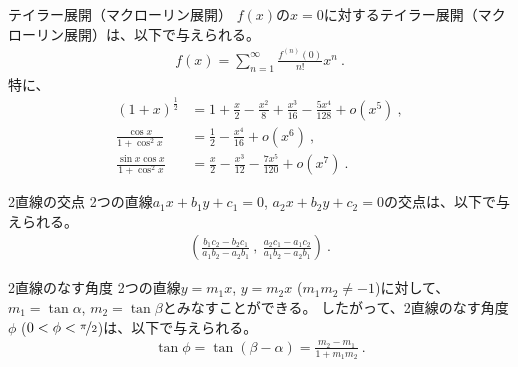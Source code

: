 




\begin{Formula}[label=formula:taylorexpansion]{テイラー展開（マクローリン展開）}
$f(x)$の$x = 0$に対するテイラー展開（マクローリン展開）は、以下で与えられる。
\begin{align*}
  f(x) = \sum_{n=1}^{\infty}\frac{f^{(n)}(0)}{n!}x^n\ .
\end{align*}
\tcbline*
特に、
\begin{align*}
  (1+x)^\frac12 &= 1+\frac x2-\frac{x^2}8+\frac{x^3}{16}-\frac{5x^4}{128}+o\!\left(x^5\right)\ ,\\
  \frac{\cos x}{1+\cos^2x} &= \frac12-\frac{x^4}{16}+o\left(x^6\right)\ ,\\
  \frac{\sin x\cos x}{1+\cos^2x} &= \frac x2-\frac{x^3}{12}-\frac{7x^5}{120}+o\left(x^7\right)\ .
\end{align*}
\end{Formula}



\begin{Formula}[label=formula:intersectionof2lines]{2直線の交点}
2つの直線$a_1x+b_1y+c_1 = 0$, $a_2x+b_2y+c_2 = 0$の交点は、以下で与えられる。
\begin{align*}
  \left(
  \frac{b_1c_2-b_2c_1}{a_1b_2-a_2b_1}~,~
  \frac{a_2c_1-a_1c_2}{a_1b_2-a_2b_1}
  \right)\ .
\end{align*}
\end{Formula}

\begin{Formula}[label=formula:anblebetween2lines]{2直線のなす角度}
2つの直線$y = m_1x$, $y = m_2x$ ($m_1m_2 \ne -1$)に対して、$m_1 = \tan\alpha$, $m_2 = \tan\beta$とみなすことができる。
したがって、2直線のなす角度$\phi$ ($0 < \phi < \nicefrac\pi2$)は、以下で与えられる。
\begin{align*}
  \tan\phi = \tan(\beta-\alpha) = \frac{m_2-m_1}{1+m_1m_2}\ .
\end{align*}
\end{Formula}




